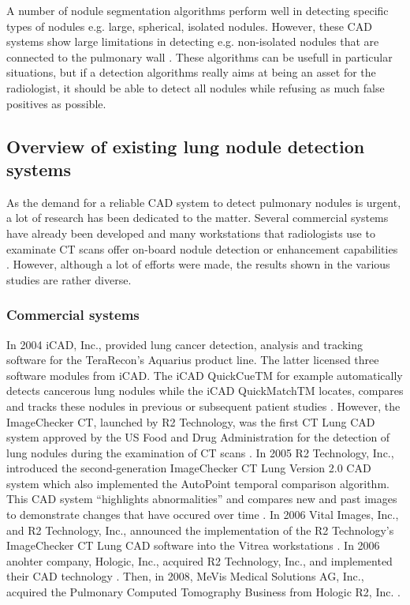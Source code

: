 A number of nodule segmentation algorithms perform well in detecting specific
types of nodules e.g. large, spherical, isolated nodules. However, these CAD
systems show large limitations in detecting e.g. non-isolated nodules that are
connected to the pulmonary wall \cite{keshani}. These algorithms can be usefull
in particular situations, but if a detection algorithms really aims at being an
asset for the radiologist, it should be able to detect all nodules while
refusing as much false positives as possible.

\subsection{Overview of existing lung nodule detection systems}
As the demand for a reliable CAD system to detect pulmonary nodules is urgent, a
lot of research has been dedicated to the matter. Several commercial systems
have already been developed and many workstations that radiologists use to
examinate CT scans offer on-board nodule detection or enhancement capabilities
\cite{ginneken}. However, although a lot of efforts were made, the results shown
in the various studies are rather diverse.

\subsubsection{Commercial systems}
In 2004 iCAD, Inc., provided lung cancer detection, analysis and tracking
software for the TeraRecon's Aquarius product line. The latter licensed three
software modules from iCAD. The iCAD QuickCueTM for example automatically
detects cancerous lung nodules while the iCAD QuickMatchTM locates, compares and tracks these
nodules in previous or subsequent patient studies \cite{tera}.
However, the ImageChecker CT, launched by R2 Technology, was the first CT Lung
CAD system approved by the US Food and Drug Administration for the detection of
lung nodules during the examination of CT scans \cite{Mevis}. In 2005 R2
Technology, Inc., introduced the second-generation ImageChecker CT Lung Version
2.0 CAD system which also implemented the AutoPoint temporal comparison
algorithm. This CAD system ``highlights abnormalities'' and compares new and
past images to demonstrate changes that have occured over time \cite{diag, r2}.
In 2006 Vital Images, Inc., and R2 Technology, Inc., announced the
implementation of the R2 Technology's ImageChecker CT Lung CAD software into
the Vitrea workstations \cite{vital}. In 2006 anohter company, Hologic, Inc.,
acquired R2 Technology, Inc., and implemented their CAD technology
\cite{Hologic}. Then, in 2008, MeVis Medical Solutions AG, Inc., acquired the
Pulmonary Computed Tomography Business from Hologic R2, Inc. \cite{Mevis}. 


